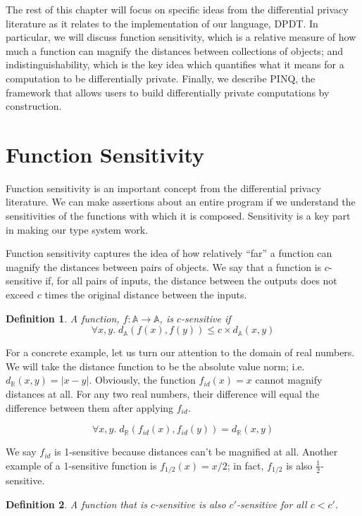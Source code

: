 \documentclass[12pt]{report}
\newtheorem{defn}{Definition}[section]
\begin{document}
The rest of this chapter will focus on specific ideas from the differential privacy literature as it relates to the implementation of our language, DPDT.
In particular, we will discuss function sensitivity, which is a relative measure of how much a function can magnify the distances between collections of objects; and indistinguishability, which is the key idea which quantifies what it means for a computation to be differentially private.
Finally, we describe PINQ, the framework that allows users to build differentially private computations by construction.

\section{Function Sensitivity}\label{subsec:fn_sens}

Function sensitivity is an important concept from the differential privacy literature.
We can make assertions about an entire program if we understand the sensitivities of the functions with which it is composed.
Sensitivity is a key part in making our type system work.

Function sensitivity captures the idea of how relatively ``far'' a function can magnify the distances between pairs of objects.
We say that a function is $c$-sensitive if, for all pairs of inputs, the distance between the outputs does not exceed $c$ times the original distance between the inputs.

\begin{defn}\label{def:csens}
  A function, $f : \mathbb A \rightarrow \mathbb A$, is $c$-sensitive if
  $$\forall x,y.\; d_{\mathbb A}(f(x),f(y)) \le c \times d_{\mathbb A}(x,y)$$
\end{defn}

For a concrete example, let us turn our attention to the domain of real numbers.
We will take the distance function to be the absolute value norm; i.e. $d_\mathbb{R}(x,y) = |x - y|$.
Obviously, the function $f_{id}(x)=x$ cannot magnify distances at all.
For any two real numbers, their difference will equal the difference between them after applying $f_{id}$.

\[
  \forall x,y.\; d_\mathbb{R}(f_{id}(x),f_{id}(y)) = d_\mathbb{R}(x,y)
\]

We say $f_{id}$ is 1-sensitive because distances can't be magnified at all.
Another example of a 1-sensitive function is $f_{1/2}(x) = x/2$; in fact, $f_{1/2}$ is also $\frac{1}{2}$-sensitive.

\begin{defn}\label{def:clessthancprime}
  A function that is $c$-sensitive is also $c'$-sensitive for all $c < c'$.
\end{defn}
\end{document}
